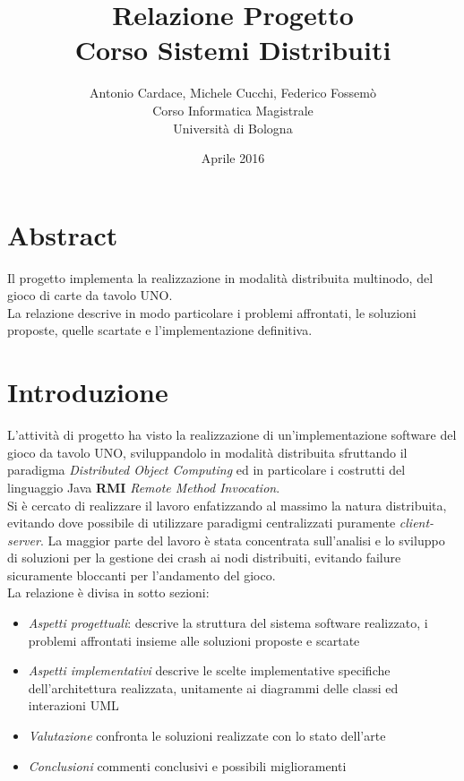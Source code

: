 \documentclass[10pt,a4paper]{article}
\begin{document}
\title{Relazione Progetto\\Corso Sistemi Distribuiti}
\author{Antonio Cardace, Michele Cucchi, Federico Fossemò\\Corso Informatica Magistrale\\Università di Bologna}
\date{Aprile 2016}
\maketitle

\section{Abstract}
Il progetto implementa la realizzazione in modalità distribuita multinodo, del gioco di carte da tavolo UNO. \\La relazione descrive in modo particolare i problemi affrontati, le soluzioni proposte, quelle scartate e l'implementazione definitiva.

\section{Introduzione}
L'attività di progetto ha visto la realizzazione di un'implementazione software del gioco da tavolo UNO, sviluppandolo in modalità distribuita sfruttando il paradigma \textit{Distributed Object Computing} ed in particolare i costrutti del linguaggio Java \textbf{RMI} \textit{Remote Method Invocation}.\\ Si è cercato di realizzare il lavoro enfatizzando al massimo la natura distribuita, evitando dove possibile di utilizzare paradigmi centralizzati puramente \textit{client-server}. La maggior parte del lavoro è stata concentrata sull'analisi e lo sviluppo di soluzioni per la gestione dei crash ai nodi distribuiti, evitando failure sicuramente bloccanti per l'andamento del gioco. \\ La relazione è divisa in sotto sezioni: \begin{itemize}\item \textit{Aspetti progettuali}: descrive la struttura del sistema software realizzato, i problemi affrontati insieme alle soluzioni proposte e scartate\item \textit{Aspetti implementativi} descrive le scelte implementative specifiche dell'architettura realizzata, unitamente ai diagrammi delle classi ed interazioni UML\item \textit{Valutazione} confronta le soluzioni realizzate con lo stato dell'arte\item \textit{Conclusioni} commenti conclusivi e possibili miglioramenti\end{itemize}
\end{document}
